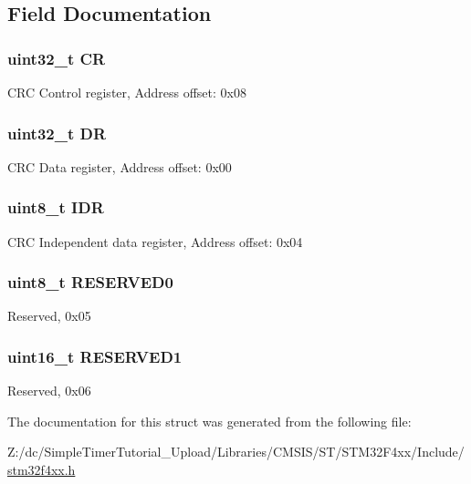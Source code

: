 \subsection{Field Documentation}
\hypertarget{struct_c_r_c___type_def_ab40c89c59391aaa9d9a8ec011dd0907a}{
\subsubsection[{C\-R}]{ uint32\-\_\-t C\-R}}\label{struct_c_r_c___type_def_ab40c89c59391aaa9d9a8ec011dd0907a}
C\-R\-C Control register, Address offset\-: 0x08 \hypertarget{struct_c_r_c___type_def_a3df0d8dfcd1ec958659ffe21eb64fa94}{
\subsubsection[{D\-R}]{ uint32\-\_\-t D\-R}}\label{struct_c_r_c___type_def_a3df0d8dfcd1ec958659ffe21eb64fa94}
C\-R\-C Data register, Address offset\-: 0x00 \hypertarget{struct_c_r_c___type_def_a601d7b0ba761c987db359b2d7173b7e0}{
\subsubsection[{I\-D\-R}]{ uint8\-\_\-t I\-D\-R}}\label{struct_c_r_c___type_def_a601d7b0ba761c987db359b2d7173b7e0}
C\-R\-C Independent data register, Address offset\-: 0x04 \hypertarget{struct_c_r_c___type_def_aa7d2bd5481ee985778c410a7e5826b71}{
\subsubsection[{R\-E\-S\-E\-R\-V\-E\-D0}]{\setlength{\rightskip}{0pt plus 5cm}uint8\-\_\-t R\-E\-S\-E\-R\-V\-E\-D0}}\label{struct_c_r_c___type_def_aa7d2bd5481ee985778c410a7e5826b71}
Reserved, 0x05 \hypertarget{struct_c_r_c___type_def_a8249a3955aace28d92109b391311eb30}{
\subsubsection[{R\-E\-S\-E\-R\-V\-E\-D1}]{\setlength{\rightskip}{0pt plus 5cm}uint16\-\_\-t R\-E\-S\-E\-R\-V\-E\-D1}}\label{struct_c_r_c___type_def_a8249a3955aace28d92109b391311eb30}
Reserved, 0x06 

The documentation for this struct was generated from the following file\-:\begin{DoxyCompactItemize}
\item 
Z\-:/dc/\-Simple\-Timer\-Tutorial\-\_\-\-Upload/\-Libraries/\-C\-M\-S\-I\-S/\-S\-T/\-S\-T\-M32\-F4xx/\-Include/\hyperlink{stm32f4xx_8h}{stm32f4xx.\-h}\end{DoxyCompactItemize}
